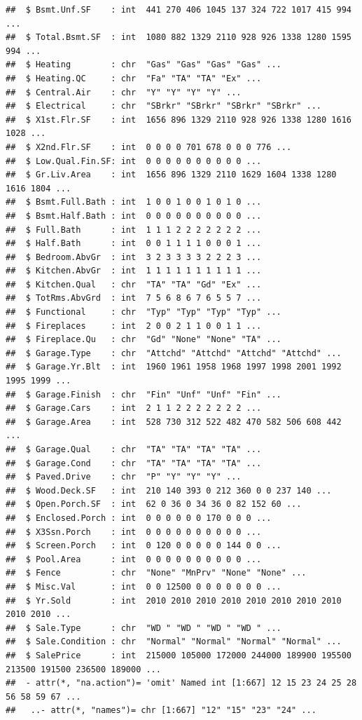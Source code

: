 \documentclass[
]{article}
\begin{document}
\begin{verbatim}
##  $ Bsmt.Unf.SF    : int  441 270 406 1045 137 324 722 1017 415 994 ...
##  $ Total.Bsmt.SF  : int  1080 882 1329 2110 928 926 1338 1280 1595 994 ...
##  $ Heating        : chr  "Gas" "Gas" "Gas" "Gas" ...
##  $ Heating.QC     : chr  "Fa" "TA" "TA" "Ex" ...
##  $ Central.Air    : chr  "Y" "Y" "Y" "Y" ...
##  $ Electrical     : chr  "SBrkr" "SBrkr" "SBrkr" "SBrkr" ...
##  $ X1st.Flr.SF    : int  1656 896 1329 2110 928 926 1338 1280 1616 1028 ...
##  $ X2nd.Flr.SF    : int  0 0 0 0 701 678 0 0 0 776 ...
##  $ Low.Qual.Fin.SF: int  0 0 0 0 0 0 0 0 0 0 ...
##  $ Gr.Liv.Area    : int  1656 896 1329 2110 1629 1604 1338 1280 1616 1804 ...
##  $ Bsmt.Full.Bath : int  1 0 0 1 0 0 1 0 1 0 ...
##  $ Bsmt.Half.Bath : int  0 0 0 0 0 0 0 0 0 0 ...
##  $ Full.Bath      : int  1 1 1 2 2 2 2 2 2 2 ...
##  $ Half.Bath      : int  0 0 1 1 1 1 0 0 0 1 ...
##  $ Bedroom.AbvGr  : int  3 2 3 3 3 3 2 2 2 3 ...
##  $ Kitchen.AbvGr  : int  1 1 1 1 1 1 1 1 1 1 ...
##  $ Kitchen.Qual   : chr  "TA" "TA" "Gd" "Ex" ...
##  $ TotRms.AbvGrd  : int  7 5 6 8 6 7 6 5 5 7 ...
##  $ Functional     : chr  "Typ" "Typ" "Typ" "Typ" ...
##  $ Fireplaces     : int  2 0 0 2 1 1 0 0 1 1 ...
##  $ Fireplace.Qu   : chr  "Gd" "None" "None" "TA" ...
##  $ Garage.Type    : chr  "Attchd" "Attchd" "Attchd" "Attchd" ...
##  $ Garage.Yr.Blt  : int  1960 1961 1958 1968 1997 1998 2001 1992 1995 1999 ...
##  $ Garage.Finish  : chr  "Fin" "Unf" "Unf" "Fin" ...
##  $ Garage.Cars    : int  2 1 1 2 2 2 2 2 2 2 ...
##  $ Garage.Area    : int  528 730 312 522 482 470 582 506 608 442 ...
##  $ Garage.Qual    : chr  "TA" "TA" "TA" "TA" ...
##  $ Garage.Cond    : chr  "TA" "TA" "TA" "TA" ...
##  $ Paved.Drive    : chr  "P" "Y" "Y" "Y" ...
##  $ Wood.Deck.SF   : int  210 140 393 0 212 360 0 0 237 140 ...
##  $ Open.Porch.SF  : int  62 0 36 0 34 36 0 82 152 60 ...
##  $ Enclosed.Porch : int  0 0 0 0 0 0 170 0 0 0 ...
##  $ X3Ssn.Porch    : int  0 0 0 0 0 0 0 0 0 0 ...
##  $ Screen.Porch   : int  0 120 0 0 0 0 0 144 0 0 ...
##  $ Pool.Area      : int  0 0 0 0 0 0 0 0 0 0 ...
##  $ Fence          : chr  "None" "MnPrv" "None" "None" ...
##  $ Misc.Val       : int  0 0 12500 0 0 0 0 0 0 0 ...
##  $ Yr.Sold        : int  2010 2010 2010 2010 2010 2010 2010 2010 2010 2010 ...
##  $ Sale.Type      : chr  "WD " "WD " "WD " "WD " ...
##  $ Sale.Condition : chr  "Normal" "Normal" "Normal" "Normal" ...
##  $ SalePrice      : int  215000 105000 172000 244000 189900 195500 213500 191500 236500 189000 ...
##  - attr(*, "na.action")= 'omit' Named int [1:667] 12 15 23 24 25 28 56 58 59 67 ...
##   ..- attr(*, "names")= chr [1:667] "12" "15" "23" "24" ...
\end{verbatim}
\end{document}
